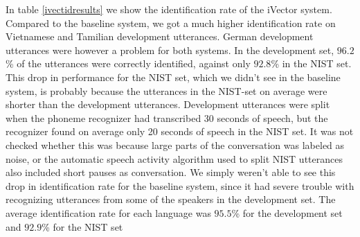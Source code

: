 In table \ref{ivectidresults} we show the identification rate of the iVector system. Compared to the baseline system, we got a much higher identification rate on Vietnamese and Tamilian development utterances. German development utterances were however a problem for both systems. In the development set, $96.2$\% of the utterances were correctly identified, against only $92.8$\% in the NIST set. This drop in performance for the NIST set, which we didn't see in the baseline system, is probably because the utterances in the NIST-set on average were shorter than the development utterances. Development utterances were split when the phoneme recognizer had transcribed 30 seconds of speech, but the recognizer found on average only 20 seconds of speech in the NIST set. It was not checked whether this was because large parts of the conversation was labeled as noise, or the automatic speech activity algorithm used to split NIST utterances also included short pauses as conversation. We simply weren't able to see this drop in identification rate for the baseline system, since it had severe trouble with recognizing utterances from some of the speakers in the development set. The average identification rate for each language was $95.5$\% for the development set and $92.9$\% for the NIST set
